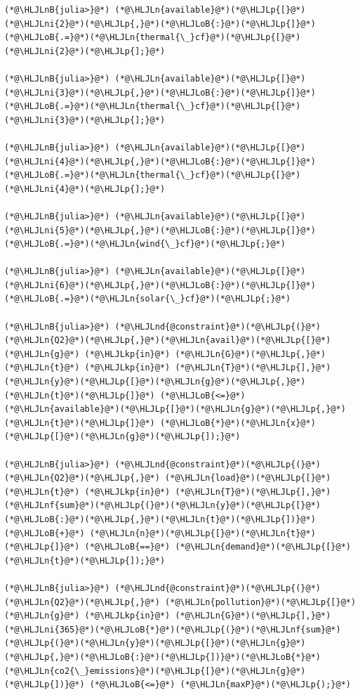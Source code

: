 \documentclass[12pt,a4paper]{article}
\newcommand{\HLJLkp}[1]{\textcolor[RGB]{148,91,176}{\textbf{#1}}}
\newcommand{\HLJLn}[1]{#1}
\newcommand{\HLJLnd}[1]{\textcolor[RGB]{214,102,97}{#1}}
\newcommand{\HLJLnf}[1]{\textcolor[RGB]{66,102,213}{#1}}
\newcommand{\HLJLnB}[1]{\textcolor[RGB]{59,151,46}{#1}}
\newcommand{\HLJLni}[1]{\textcolor[RGB]{59,151,46}{#1}}
\newcommand{\HLJLoB}[1]{\textcolor[RGB]{102,102,102}{\textbf{#1}}}
\newcommand{\HLJLp}[1]{#1}
\begin{document}
\begin{lstlisting}
(*@\HLJLnB{julia>}@*) (*@\HLJLn{available}@*)(*@\HLJLp{[}@*)(*@\HLJLni{2}@*)(*@\HLJLp{,}@*)(*@\HLJLoB{:}@*)(*@\HLJLp{]}@*) (*@\HLJLoB{.=}@*)(*@\HLJLn{thermal{\_}cf}@*)(*@\HLJLp{[}@*)(*@\HLJLni{2}@*)(*@\HLJLp{];}@*)

(*@\HLJLnB{julia>}@*) (*@\HLJLn{available}@*)(*@\HLJLp{[}@*)(*@\HLJLni{3}@*)(*@\HLJLp{,}@*)(*@\HLJLoB{:}@*)(*@\HLJLp{]}@*) (*@\HLJLoB{.=}@*)(*@\HLJLn{thermal{\_}cf}@*)(*@\HLJLp{[}@*)(*@\HLJLni{3}@*)(*@\HLJLp{];}@*)

(*@\HLJLnB{julia>}@*) (*@\HLJLn{available}@*)(*@\HLJLp{[}@*)(*@\HLJLni{4}@*)(*@\HLJLp{,}@*)(*@\HLJLoB{:}@*)(*@\HLJLp{]}@*) (*@\HLJLoB{.=}@*)(*@\HLJLn{thermal{\_}cf}@*)(*@\HLJLp{[}@*)(*@\HLJLni{4}@*)(*@\HLJLp{];}@*)

(*@\HLJLnB{julia>}@*) (*@\HLJLn{available}@*)(*@\HLJLp{[}@*)(*@\HLJLni{5}@*)(*@\HLJLp{,}@*)(*@\HLJLoB{:}@*)(*@\HLJLp{]}@*) (*@\HLJLoB{.=}@*)(*@\HLJLn{wind{\_}cf}@*)(*@\HLJLp{;}@*)

(*@\HLJLnB{julia>}@*) (*@\HLJLn{available}@*)(*@\HLJLp{[}@*)(*@\HLJLni{6}@*)(*@\HLJLp{,}@*)(*@\HLJLoB{:}@*)(*@\HLJLp{]}@*) (*@\HLJLoB{.=}@*)(*@\HLJLn{solar{\_}cf}@*)(*@\HLJLp{;}@*)

(*@\HLJLnB{julia>}@*) (*@\HLJLnd{@constraint}@*)(*@\HLJLp{(}@*)(*@\HLJLn{Q2}@*)(*@\HLJLp{,}@*)(*@\HLJLn{avail}@*)(*@\HLJLp{[}@*)(*@\HLJLn{g}@*) (*@\HLJLkp{in}@*) (*@\HLJLn{G}@*)(*@\HLJLp{,}@*) (*@\HLJLn{t}@*) (*@\HLJLkp{in}@*) (*@\HLJLn{T}@*)(*@\HLJLp{],}@*)(*@\HLJLn{y}@*)(*@\HLJLp{[}@*)(*@\HLJLn{g}@*)(*@\HLJLp{,}@*)(*@\HLJLn{t}@*)(*@\HLJLp{]}@*) (*@\HLJLoB{<=}@*) (*@\HLJLn{available}@*)(*@\HLJLp{[}@*)(*@\HLJLn{g}@*)(*@\HLJLp{,}@*)(*@\HLJLn{t}@*)(*@\HLJLp{]}@*) (*@\HLJLoB{*}@*)(*@\HLJLn{x}@*)(*@\HLJLp{[}@*)(*@\HLJLn{g}@*)(*@\HLJLp{]);}@*)

(*@\HLJLnB{julia>}@*) (*@\HLJLnd{@constraint}@*)(*@\HLJLp{(}@*)(*@\HLJLn{Q2}@*)(*@\HLJLp{,}@*) (*@\HLJLn{load}@*)(*@\HLJLp{[}@*)(*@\HLJLn{t}@*) (*@\HLJLkp{in}@*) (*@\HLJLn{T}@*)(*@\HLJLp{],}@*) (*@\HLJLnf{sum}@*)(*@\HLJLp{(}@*)(*@\HLJLn{y}@*)(*@\HLJLp{[}@*)(*@\HLJLoB{:}@*)(*@\HLJLp{,}@*)(*@\HLJLn{t}@*)(*@\HLJLp{])}@*)(*@\HLJLoB{+}@*) (*@\HLJLn{n}@*)(*@\HLJLp{[}@*)(*@\HLJLn{t}@*)(*@\HLJLp{]}@*) (*@\HLJLoB{==}@*) (*@\HLJLn{demand}@*)(*@\HLJLp{[}@*)(*@\HLJLn{t}@*)(*@\HLJLp{]);}@*)

(*@\HLJLnB{julia>}@*) (*@\HLJLnd{@constraint}@*)(*@\HLJLp{(}@*)(*@\HLJLn{Q2}@*)(*@\HLJLp{,}@*) (*@\HLJLn{pollution}@*)(*@\HLJLp{[}@*)(*@\HLJLn{g}@*) (*@\HLJLkp{in}@*) (*@\HLJLn{G}@*)(*@\HLJLp{],}@*) (*@\HLJLni{365}@*)(*@\HLJLoB{*}@*)(*@\HLJLp{(}@*)(*@\HLJLnf{sum}@*)(*@\HLJLp{(}@*)(*@\HLJLn{y}@*)(*@\HLJLp{[}@*)(*@\HLJLn{g}@*)(*@\HLJLp{,}@*)(*@\HLJLoB{:}@*)(*@\HLJLp{])}@*)(*@\HLJLoB{*}@*)(*@\HLJLn{co2{\_}emissions}@*)(*@\HLJLp{[}@*)(*@\HLJLn{g}@*)(*@\HLJLp{])}@*) (*@\HLJLoB{<=}@*) (*@\HLJLn{maxP}@*)(*@\HLJLp{);}@*)


\end{lstlisting}
\end{document}
